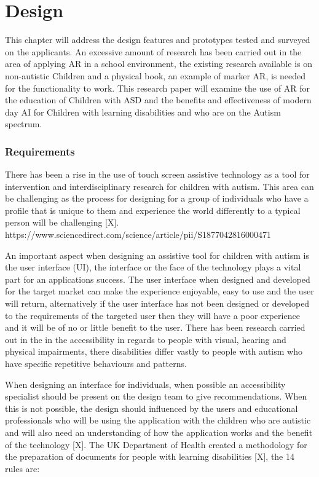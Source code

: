 \chapter{Design}
\label{chap:design}


This chapter will address the design features and prototypes tested and surveyed on the applicants. An excessive amount of research has been carried out in the area of applying AR in a school environment, the existing research available is on non-autistic Children and a physical book, an example of marker AR, is needed for the functionality to work. This research paper will examine the use of AR for the education of Children with ASD and the benefits and effectiveness of modern day AI for Children with learning disabilities and who are on the Autism spectrum. 


\subsection{Requirements} 

There has been a rise in the use of touch screen assistive technology as a tool for intervention and interdisciplinary research for children with autism. This area can be challenging as the process for designing for a group of individuals who have a profile that is unique to them and experience the world differently to a typical person will be challenging [X]. https://www.sciencedirect.com/science/article/pii/S1877042816000471

An important aspect when designing an assistive tool for children with autism is the user interface (UI), the interface or the face of the technology plays a vital part for an applications success. The user interface when designed and developed for the target market can make the experience enjoyable, easy to use and the user will return, alternatively if the user interface has not been designed or developed to the requirements of the targeted user then they will have a poor experience and it will be of no or little benefit to the user. There has been research carried out in the in the accessibility in regards to people with visual, hearing and physical impairments, there disabilities differ vastly to people with autism who have specific repetitive behaviours and patterns.

When designing an interface for individuals, when possible an accessibility specialist should be present on the design team to give recommendations. When this is not possible, the design should influenced by the users and educational professionals who will be using the application with the children who are autistic and will also need an understanding of how the application works and the benefit of the technology [X]. The UK Department of Health created a methodology for the preparation of documents for people with learning disabilities [X], the 14 rules are:

